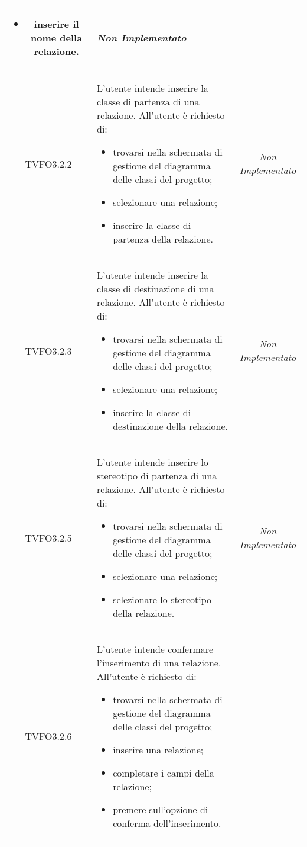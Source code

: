 \begin{longtable}{|c|>{}m{8cm}|c|}
\begin{itemize}
	\item inserire il nome della relazione.
\end{itemize} & \textit{Non Implementato}\\ \hline
\hypertarget{TVFO3.2.2}{TVFO3.2.2} & L'utente intende inserire la classe di partenza di una relazione.
All'utente è richiesto di:
\begin{itemize}
	\item trovarsi nella schermata di gestione del diagramma delle classi del progetto;
	\item selezionare una relazione;
	\item inserire la classe di partenza della relazione.
\end{itemize} & \textit{Non Implementato}\\ \hline
\hypertarget{TVFO3.2.3}{TVFO3.2.3} & L'utente intende inserire la classe di destinazione di una relazione.
All'utente è richiesto di:
\begin{itemize}
	\item trovarsi nella schermata di gestione del diagramma delle classi del progetto;
	\item selezionare una relazione;
	\item inserire la classe di destinazione della relazione.
\end{itemize} & \textit{Non Implementato}\\ \hline
\hypertarget{TVFO3.2.5}{TVFO3.2.5} & L'utente intende inserire lo stereotipo di partenza di una relazione.
All'utente è richiesto di:
\begin{itemize}
	\item trovarsi nella schermata di gestione del diagramma delle classi del progetto;
	\item selezionare una relazione;
	\item selezionare lo stereotipo della relazione.
\end{itemize} & \textit{Non Implementato}\\ \hline
\hypertarget{TVFO3.2.6}{TVFO3.2.6} & L'utente intende confermare l'inserimento di una relazione. 
All'utente è richiesto di: 
\begin{itemize} 
	\item trovarsi nella schermata di gestione del diagramma delle classi del progetto;
	\item inserire una relazione;
	\item completare i campi della relazione;
	\item premere sull'opzione di conferma dell'inserimento.

\end{itemize}
\end{longtable}
